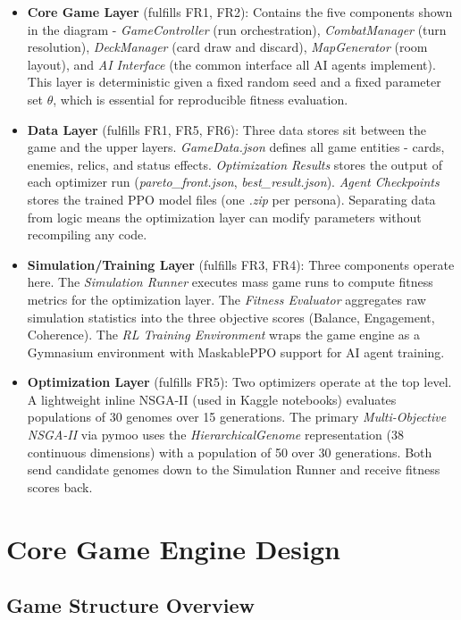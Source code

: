 \begin{itemize}
    \item \textbf{Core Game Layer} (fulfills FR1, FR2): Contains the five components shown in the diagram - \textit{GameController} (run orchestration), \textit{CombatManager} (turn resolution), \textit{DeckManager} (card draw and discard), \textit{MapGenerator} (room layout), and \textit{AI Interface} (the common interface all AI agents implement). This layer is deterministic given a fixed random seed and a fixed parameter set $\theta$, which is essential for reproducible fitness evaluation.
    \item \textbf{Data Layer} (fulfills FR1, FR5, FR6): Three data stores sit between the game and the upper layers. \textit{GameData.json} defines all game entities - cards, enemies, relics, and status effects. \textit{Optimization Results} stores the output of each optimizer run (\textit{pareto\_front.json}, \textit{best\_result.json}). \textit{Agent Checkpoints} stores the trained PPO model files (one \textit{.zip} per persona). Separating data from logic means the optimization layer can modify parameters without recompiling any code.
    \item \textbf{Simulation/Training Layer} (fulfills FR3, FR4): Three components operate here. The \textit{Simulation Runner} executes mass game runs to compute fitness metrics for the optimization layer. The \textit{Fitness Evaluator} aggregates raw simulation statistics into the three objective scores (Balance, Engagement, Coherence). The \textit{RL Training Environment} wraps the game engine as a Gymnasium environment with MaskablePPO support for AI agent training.
    \item \textbf{Optimization Layer} (fulfills FR5): Two optimizers operate at the top level. A lightweight inline NSGA-II (used in Kaggle notebooks) evaluates populations of 30 genomes over 15 generations. The primary \textit{Multi-Objective NSGA-II} via pymoo uses the \textit{HierarchicalGenome} representation (38 continuous dimensions) with a population of 50 over 30 generations. Both send candidate genomes down to the Simulation Runner and receive fitness scores back.
\end{itemize}

\section{Core Game Engine Design}

\subsection{Game Structure Overview}

